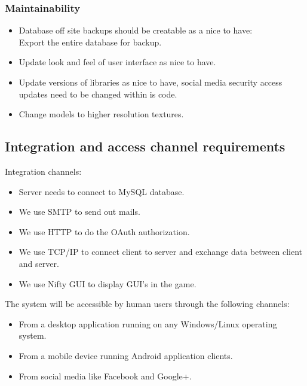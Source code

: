 \documentclass[letterpaper]{article}
\begin{document}
				\subsubsection*{Maintainability}
				\vspace{0.1in}
				
					\begin{itemize}
						\item Database off site backups should be creatable as a nice to have: \\
								Export the entire database for backup.
						\item Update look and feel of user interface as nice to have.
						\item Update versions of libraries as nice to have, social media security access updates need to be changed within is code.
						\item Change models to higher resolution textures.
					\end{itemize}
				
			\vspace{0.2in}
			\subsection*{ Integration and access channel requirements }
			\vspace{0.1in}
			
				\hspace{5mm}Integration channels:
					\begin{itemize}
						\item Server needs to connect to MySQL database.
						\item We use SMTP to send out mails.
						\item We use HTTP to do the OAuth authorization.
						\item We use TCP/IP to connect client to server and exchange data between client and server.
						\item We use Nifty GUI to display GUI's in the game. \\
					\end{itemize}
				
				The system will be accessible by human users through the following channels:
				\begin{itemize}
					\item From a desktop application running on any Windows/Linux operating system.
					\item From a mobile device running Android application clients.
					\item From social media like Facebook and Google+.
				\end{itemize}
				
\end{document}
